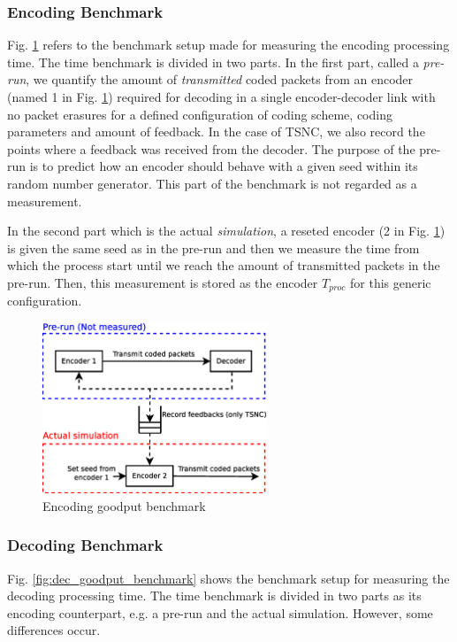 \subsubsection{Encoding Benchmark}
Fig. \ref{fig:enc_goodput_benchmark} refers to the benchmark setup
made for measuring the encoding processing time. The time benchmark
is divided in two parts. In the first part, called a \textit{pre-run},
we quantify the amount of \textit{transmitted} coded packets from an
encoder (named 1 in Fig. \ref{fig:enc_goodput_benchmark}) required for
decoding in a single encoder-decoder link with no packet erasures
for a defined configuration of coding scheme, coding parameters and
amount of feedback. In the case of \ac{TSNC}, we also record the
points where a feedback was received from the decoder. The purpose of
the pre-run is to predict how an encoder should behave with a given
seed within its random number generator. This part of the benchmark is
not regarded as a measurement.

In the second part which is the actual \textit{simulation}, a reseted
encoder (2 in Fig. \ref{fig:enc_goodput_benchmark}) is given the same
seed as in the pre-run and then we measure the time from which the
process start until we reach the amount of transmitted packets in the
pre-run. Then, this measurement is stored as the encoder $T_{proc}$
for this generic configuration.

\begin{figure}[ht!]
\centering
\includegraphics[width=0.6\textwidth]{images/measure_encoder.eps}
\caption{Encoding goodput benchmark}
\label{fig:enc_goodput_benchmark}
\end{figure}

\subsubsection{Decoding Benchmark}
Fig. \ref{fig:dec_goodput_benchmark} shows the benchmark setup
for measuring the decoding processing time. The time benchmark
is divided in two parts as its encoding counterpart, e.g. a pre-run
and the actual simulation. However, some differences occur.

